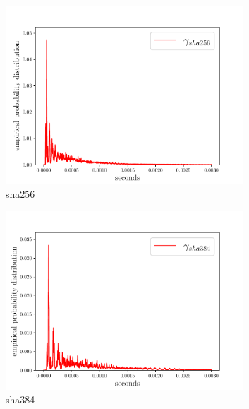 \documentclass[12pt,a4paper,automark, toc=bib]{scrreprt}
\theoremstyle{definition}
\begin{document}
		\begin{figure}
			
			\begin{subfigure}{0.5\textwidth}
				\includegraphics[width=0.98\textwidth]{figures/_CC_compare_completeopenssl_sha256_cc_3_light.pdf}
				\caption{sha256}
			\end{subfigure}
			\begin{subfigure}{0.5\textwidth}
				\includegraphics[width=0.98\textwidth]{figures/_CC_compare_completeopenssl_sha384_cc_0_light.pdf}
				\caption{sha384}
			\end{subfigure}
			\begin{subfigure}{0.5\textwidth}

\end{subfigure}
\end{figure}
\end{document}
